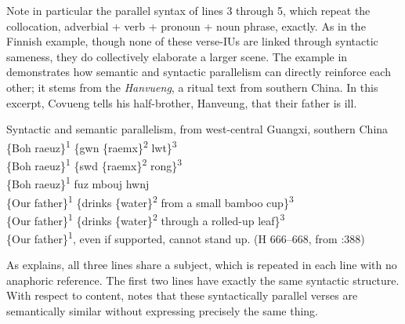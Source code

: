\noindent Note in particular the parallel syntax of lines 3 through 5, which repeat the collocation, adverbial + verb + pronoun + noun phrase, exactly. As in the Finnish example, though none of these verse-IUs are linked through syntactic sameness, they do collectively elaborate a larger scene. The example in  demonstrates how semantic and syntactic parallelism can directly reinforce each other; it stems from the \textit{Hanvueng}, a ritual text from southern China. In this excerpt, Covueng tells his half-brother, Hanveung, that their father is ill.

\ea%
\label{ex:6:29}Syntactic and semantic parallelism, from west-central Guangxi, southern China\\
\{Boh raeuz\}\textsuperscript{1} \{gwn \{raemx\}\textsuperscript{2} lwt\}\textsuperscript{3} \\
\{Boh raeuz\}\textsuperscript{1} \{swd \{raemx\}\textsuperscript{2} rong\}\textsuperscript{3} \\
\{Boh raeuz\}\textsuperscript{1} fuz mbouj hwnj \\
\{Our father\}\textsuperscript{1} \{drinks \{water\}\textsuperscript{2} from a small bamboo cup\}\textsuperscript{3}   \\
\{Our father\}\textsuperscript{1} \{drinks \{water\}\textsuperscript{2} through a rolled-up leaf\}\textsuperscript{3}\\
\{Our father\}\textsuperscript{1}, even if supported, cannot stand up.
(H 666--668, from \citealt{Holm2017}:388)
\z

\noindent As \citet[388]{Holm2017} explains, all three lines share a subject, which is repeated in each line with no anaphoric reference. The first two lines have exactly the same syntactic structure. With respect to content, \citet[212]{FrogTarkka2017} notes that these syntactically parallel verses are semantically similar without expressing precisely the same thing.

